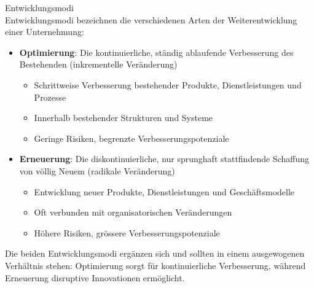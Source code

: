 \begin{definition}{Entwicklungsmodi}\\
Entwicklungsmodi bezeichnen die verschiedenen Arten der Weiterentwicklung einer Unternehmung:
\begin{itemize}
    \item \textbf{Optimierung}: Die kontinuierliche, ständig ablaufende Verbesserung des Bestehenden (inkrementelle Veränderung)
    \begin{itemize}
        \item Schrittweise Verbesserung bestehender Produkte, Dienstleistungen und Prozesse
        \item Innerhalb bestehender Strukturen und Systeme
        \item Geringe Risiken, begrenzte Verbesserungspotenziale
    \end{itemize}
    \item \textbf{Erneuerung}: Die diskontinuierliche, nur sprunghaft stattfindende Schaffung von völlig Neuem (radikale Veränderung)
    \begin{itemize}
        \item Entwicklung neuer Produkte, Dienstleistungen und Geschäftsmodelle
        \item Oft verbunden mit organisatorischen Veränderungen
        \item Höhere Risiken, grössere Verbesserungspotenziale
    \end{itemize}
\end{itemize}

Die beiden Entwicklungsmodi ergänzen sich und sollten in einem ausgewogenen Verhältnis stehen: Optimierung sorgt für kontinuierliche Verbesserung, während Erneuerung disruptive Innovationen ermöglicht.
\end{definition}

